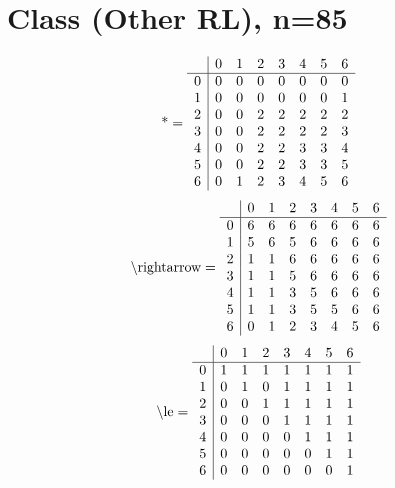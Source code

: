 \documentclass[11pt]{article}
\begin{document}
\section{Class (Other RL), n=85}
\[\text{*} = 
\begin{array}{r | r r r r r r r}
 & 0 & 1 & 2 & 3 & 4 & 5 & 6 \\ \hline
0 & 0 & 0 & 0 & 0 & 0 & 0 & 0 \\
1 & 0 & 0 & 0 & 0 & 0 & 0 & 1 \\
2 & 0 & 0 & 2 & 2 & 2 & 2 & 2 \\
3 & 0 & 0 & 2 & 2 & 2 & 2 & 3 \\
4 & 0 & 0 & 2 & 2 & 3 & 3 & 4 \\
5 & 0 & 0 & 2 & 2 & 3 & 3 & 5 \\
6 & 0 & 1 & 2 & 3 & 4 & 5 & 6 \\
\end{array}
\]
\[\text{\textbackslash rightarrow} = 
\begin{array}{r | r r r r r r r}
 & 0 & 1 & 2 & 3 & 4 & 5 & 6 \\ \hline
0 & 6 & 6 & 6 & 6 & 6 & 6 & 6 \\
1 & 5 & 6 & 5 & 6 & 6 & 6 & 6 \\
2 & 1 & 1 & 6 & 6 & 6 & 6 & 6 \\
3 & 1 & 1 & 5 & 6 & 6 & 6 & 6 \\
4 & 1 & 1 & 3 & 5 & 6 & 6 & 6 \\
5 & 1 & 1 & 3 & 5 & 5 & 6 & 6 \\
6 & 0 & 1 & 2 & 3 & 4 & 5 & 6 \\
\end{array}
\]
\[\text{\textbackslash le} = 
\begin{array}{r | r r r r r r r}
 & 0 & 1 & 2 & 3 & 4 & 5 & 6 \\ \hline
0 & 1 & 1 & 1 & 1 & 1 & 1 & 1 \\
1 & 0 & 1 & 0 & 1 & 1 & 1 & 1 \\
2 & 0 & 0 & 1 & 1 & 1 & 1 & 1 \\
3 & 0 & 0 & 0 & 1 & 1 & 1 & 1 \\
4 & 0 & 0 & 0 & 0 & 1 & 1 & 1 \\
5 & 0 & 0 & 0 & 0 & 0 & 1 & 1 \\
6 & 0 & 0 & 0 & 0 & 0 & 0 & 1 \\
\end{array}
\]
\end{document}
